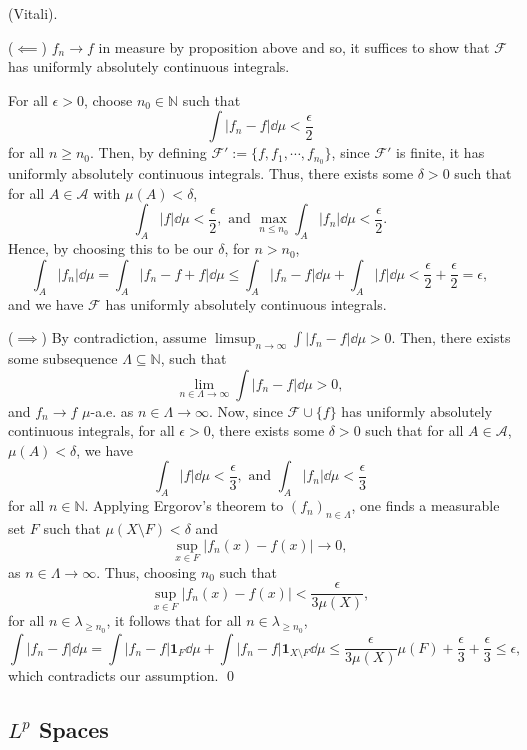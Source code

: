 \documentclass[
]{article}
\theoremstyle{definition}
\theoremstyle{definition}
\begin{document}
\proof (Vitali).

(\(\impliedby\)) \(f_n \to f\) in measure by proposition above and so,
it suffices to show that \(\mathcal{F}\) has uniformly absolutely
continuous integrals.

For all \(\epsilon > 0\), choose \(n_0 \in \mathbb{N}\) such that
\[\int |f_n - f| \dd\mu < \frac{\epsilon}{2}\] for all \(n \ge n_0\).
Then, by defining \(\mathcal{F}' := \{f, f_1, \cdots, f_{n_0}\}\), since
\(\mathcal{F}'\) is finite, it has uniformly absolutely continuous
integrals. Thus, there exists some \(\delta > 0\) such that for all
\(A \in \mathcal{A}\) with \(\mu(A) < \delta\),
\[\int_A |f| \dd \mu < \frac{\epsilon}{2}, \text{ and } 
    \max_{n \le n_0} \int_A |f_n| \dd\mu < \frac{\epsilon}{2}.\] Hence,
by choosing this to be our \(\delta\), for \(n > n_0\),
\[\int_A |f_n| \dd \mu = \int_A |f_n - f + f| \dd \mu 
    \le \int_A |f_n - f| \dd \mu + \int_A |f| \dd \mu < \frac{\epsilon}{2} 
    + \frac{\epsilon}{2} = \epsilon,\] and we have \(\mathcal{F}\) has
uniformly absolutely continuous integrals.

(\(\implies\)) By contradiction, assume
\(\limsup_{n \to \infty} \int |f_n - f| \dd\mu > 0\). Then, there exists
some subsequence \(\Lambda \subseteq \mathbb{N}\), such that
\[\lim_{n \in \Lambda \to \infty}\int |f_n - f| \dd \mu > 0,\] and
\(f_n \to f\) \(\mu\)-a.e. as \(n \in \Lambda \to \infty\). Now, since
\(\mathcal{F} \cup \{f\}\) has uniformly absolutely continuous
integrals, for all \(\epsilon > 0\), there exists some \(\delta > 0\)
such that for all \(A \in \mathcal{A}\), \(\mu(A) < \delta\), we have
\[\int_A |f| \dd\mu < \frac{\epsilon}{3}, \text{ and } \int_A |f_n| \dd\mu < \frac{\epsilon}{3}\]
for all \(n \in \mathbb{N}\). Applying Ergorov's theorem to
\((f_n)_{n \in \Lambda}\), one finds a measurable set \(F\) such that
\(\mu(X \setminus F) < \delta\) and
\[\sup_{x \in F} |f_n(x) - f(x)| \to 0,\] as
\(n \in \Lambda \to \infty\). Thus, choosing \(n_0\) such that
\[\sup_{x \in F} |f_n(x) - f(x)| < \frac{\epsilon}{3 \mu(X)},\] for all
\(n \in \lambda_{\ge n_0}\), it follows that for all
\(n \in \lambda_{\ge n_0}\),
\[\int |f_n - f| \dd \mu = \int |f_n - f| \mathbf{1}_F \dd \mu + 
    \int |f_n - f| \mathbf{1}_{X \setminus F} \dd\mu \le 
    \frac{\epsilon}{3\mu(X)} \mu(F) + 
    \frac{\epsilon}{3} + \frac{\epsilon}{3} \le \epsilon,\] which
contradicts our assumption. \qed

\hypertarget{lp-spaces}{%
\subsection{\texorpdfstring{\(L^p\)
Spaces}{L\^{}p Spaces}}\label{lp-spaces}}
\end{document}
